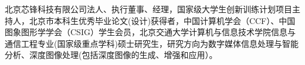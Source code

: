 \huawenfangsong
{}


\begin{cvparagraph}
\vspace{0.5mm}
\hspace{6mm}   北京芯锋科技有限公司法人、执行董事、经理，国家级大学生创新训练计划项目主持人，北京市本科生优秀毕业论文(设计)获得者，中国计算机学会（CCF）、中国图象图形学学会（CSIG）学生会员，北京交通大学计算机与信息技术学院信息与通信工程专业(国家级重点学科)硕士研究生，研究方向为数字媒体信息处理与智能分析、深度图像处理(包括深度图像的生成、增强和应用）。

\end{cvparagraph}
